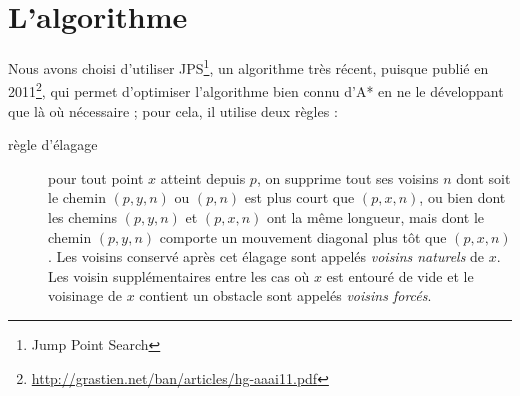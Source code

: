 \documentclass[a4paper,11pt]{article}
\begin{document}
\section{L'algorithme}
Nous avons choisi d'utiliser JPS\footnote{Jump Point Search}, un algorithme très
récent, puisque publié en
2011\footnote{\url{http://grastien.net/ban/articles/hg-aaai11.pdf}}, qui permet
d'optimiser l'algorithme bien connu d'A* en ne le 
développant que là où nécessaire ; pour cela, il utilise deux règles :
\begin{description}
\item[règle d'élagage] pour tout point $x$ atteint depuis $p$, on supprime tout
    ses voisins $n$ dont soit le chemin $(p,y,n)$
    ou $(p,n)$ est plus court que $(p,x,n)$, ou bien dont les chemins $(p,y,n)$
    et $(p,x,n)$ ont la même longueur, mais dont le
    chemin $(p,y,n)$ comporte un mouvement diagonal plus tôt que $(p,x,n)$. Les
    voisins conservé après cet élagage sont appelés 
    \emph{voisins naturels} de $x$. Les voisin supplémentaires entre les cas où
    $x$ est entouré de vide et le voisinage de $x$ 
    contient un obstacle sont appelés \emph{voisins forcés}.


\end{description}
\end{document}
